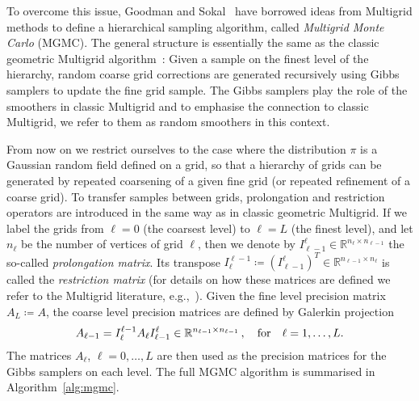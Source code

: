 \documentclass[
fontsize=11pt,
paper=a4,
numbers=noenddot
]{scrartcl}
\begin{document}
To overcome this issue, Goodman and Sokal~\cite{goodmansokal} have borrowed ideas from Multigrid methods to define a hierarchical sampling algorithm, called \emph{Multigrid Monte Carlo} (MGMC). The general structure is essentially the same as the classic geometric Multigrid algorithm~\cite{hackbuschMultiGridMethodsApplications1985}: Given a sample on the finest level of the hierarchy, random coarse grid corrections are generated recursively using Gibbs samplers to update the fine grid sample. The Gibbs samplers play the role of the smoothers in classic Multigrid and to emphasise the connection to classic Multigrid, we refer to them as random smoothers in this context. 

From now on we restrict ourselves to the case where the distribution $\pi$ is a Gaussian random field defined on a grid, so that a hierarchy of grids can be generated by repeated coarsening of a given fine grid (or repeated refinement of a coarse grid). To transfer samples between grids, prolongation and restriction operators are introduced in the same way as in classic  geometric Multigrid. If we label the grids from $\ell = 0$ (the coarsest level) to $\ell = L$ (the finest level), and let $n_\ell$ be the number of vertices of grid $\ell$, then we denote by $I_{\ell-1}^\ell \in \mathbb{R}^{n_\ell \times n_{\ell - 1}}$ the so-called \emph{prolongation matrix}. Its transpose $I_{\ell}^{\ell-1} \coloneqq {(I_{\ell-1}^\ell)}^T \in \mathbb{R}^{n_{\ell - 1} \times n_{\ell}}$ is called the \emph{restriction matrix} (for details on how these matrices are defined we refer to the Multigrid literature, e.g.,~\cite{hackbuschMultiGridMethodsApplications1985}). Given the fine level precision matrix $A_L \coloneqq A$, the coarse level precision matrices are defined by Galerkin projection
\begin{equation*}
    A_{\ell-1} = I_\ell^{\ell - 1} A_\ell I_{\ell-1}^\ell \in \mathbb{R}^{n_{\ell-1} \times n_{\ell-1}}\,, \quad \text{for\quad$\ell = 1, \dotsc, L$.}
\end{equation*}
The matrices $A_\ell$, $\ell = 0, \dotsc, L$ are then used as the precision matrices for the Gibbs samplers on each level. The full MGMC algorithm is summarised in Algorithm~\ref{alg:mgmc}.
\end{document}
